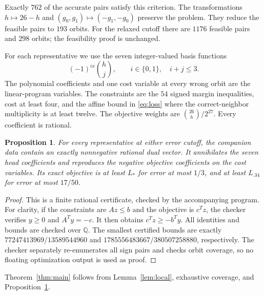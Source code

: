 \documentclass[11pt]{article}
\newtheorem{proposition}{Proposition}
\begin{document}
Exactly $762$ of the accurate pairs satisfy this criterion. The transformations $h\mapsto26-h$ and $(g_0,g_1)\mapsto(-g_1,-g_0)$ preserve the problem. They reduce the feasible pairs to $193$ orbits. For the relaxed cutoff there are $1176$ feasible pairs and $298$ orbits; the feasibility proof is unchanged.

For each representative we use the seven integer-valued basis functions
\[
 (-1)^{ix}\binom hj,\qquad i\in\{0,1\},\quad i+j\le3.
\]
The polynomial coefficients and one cost variable at every wrong orbit are the linear-program variables. The constraints are the $54$ signed margin inequalities, cost at least four, and the affine bound in \eqref{eq:loss} where the correct-neighbor multiplicity is at least twelve. The objective weights are $\binom{26}{h}/2^{27}$. Every coefficient is rational.

\begin{proposition}\label{prop:certificate}
For every representative at either error cutoff, the companion data contain an exactly nonnegative rational dual vector. It annihilates the seven head coefficients and reproduces the negative objective coefficients on the cost variables. Its exact objective is at least $L_*$ for error at most $1/3$, and at least $L_{.34}$ for error at most $17/50$.
\end{proposition}
\begin{proof}
This is a finite rational certificate, checked by the accompanying program. For clarity, if the constraints are $Az\le b$ and the objective is $c^Tz$, the checker verifies $y\ge0$ and $A^Ty=-c$. It then obtains $c^Tz\ge-b^Ty$. All identities and bounds are checked over $\mathbb Q$. The smallest certified bounds are exactly $77247413969/13589544960$ and $1785556483667/380507258880$, respectively. The checker separately re-enumerates all sign pairs and checks orbit coverage, so no floating optimization output is used as proof.
\end{proof}
Theorem~\ref{thm:main} follows from Lemma~\ref{lem:local}, exhaustive coverage, and Proposition~\ref{prop:certificate}.
\end{document}
